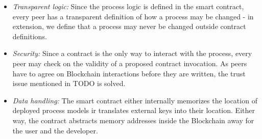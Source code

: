 \begin{itemize}
    \item \emph{Transparent logic:} Since the process logic is defined in the smart contract, every peer has a transparent definition of how a process may be changed - in extension, we define that a process may never be changed outside contract definitions.
    \item \emph{Security:} Since a contract is the only way to interact with the process, every peer may check on the validity of a proposed contract invocation. As peers have to agree on Blockchain interactions before they are written, the trust issue mentioned in TODO is solved.
    \item \emph{Data handling:} The smart contract either internally memorizes the location of deployed process models ir translates external keys into their location. Either way, the contract abstracts memory addresses inside the Blockchain away for the user and the developer.
\end{itemize}